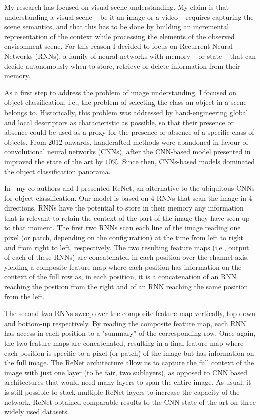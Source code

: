 My research has focused on visual scene understanding. My claim is that
understanding a visual scene -- be it an image or a video -- requires capturing
the scene semantics, and that this has to be done by building an incremental
representation of the context while processing the elements of the observed
environment scene. For this reason I decided to focus on Recurrent Neural
Networks (RNNs), a family of neural networks with memory -- or state -- that
can decide autonomously when to store, retrieve or delete information from
their memory.

As a first step to address the problem of image understanding, I focused on
object classification, i.e., the problem of selecting the class an object in a
scene belongs to. Historically, this problem was addressed by hand-engineering
global and local descriptors as characteristic as possible, so that their
presence or absence could be used as a proxy for the presence or absence of a
specific class of objects. From 2012 onwards, handcrafted methods were
abandoned in favour of convolutional neural networks (CNNs), after the
CNN-based model presented in~\cite{Krizhevsky-2012} improved the state of the
art by $10\%$. Since then, CNNs-based models dominated the object
classification panorama.

In~\cite{visin2015renet} my co-authors and I presented ReNet, an alternative to
the ubiquitous CNNs for object classification. Our model is based on 4 RNNs
that scan the image in 4 directions. RNNs have the potential to store in their
memory any information that is relevant to retain the context of the part of
the image they have seen up to that moment. The first two RNNs scan each line
of the image reading one pixel (or patch, depending on the configuration) at
the time from left to right and from right to left, respectively. The two
resulting feature maps (i.e., output of each of these RNNs) are concatenated in
each position over the channel axis, yielding a composite feature map where
each position has information on the context of the full row as, in each
position, it is a concatenation of an RNN reaching the position from the right
and of an RNN reaching the same position from the left.

The second two RNNs sweep over the composite feature map vertically, top-down
and bottom-up respectively. By reading the composite feature map, each RNN has
access in each position to a "summary" of the corresponding row. Once again,
the two feature maps are concatenated, resulting in a final feature map where
each position is specific to a pixel (or patch) of the image but has
information on the full image. The ReNet architecture allow us to capture the
full context of the image with just one layer (to be fair, two sublayers), as
opposed to CNN based architectures that would need many layers to span the
entire image. As usual, it is still possible to stack multiple ReNet layers to
increase the capacity of the network. ReNet obtained comparable results to the
CNN state-of-the-art on three widely used datasets.

